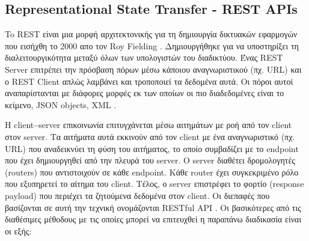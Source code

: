\subsection{Representational State Transfer - REST APIs}

To REST είναι μια μορφή αρχιτεκτονικής για τη δημιουργία δικτυακών εφαρμογών που εισήχθη το 2000 απο τον Roy Fielding \cite{[REST2]}. Δημιουργήθηκε για να υποστηρίξει τη διαλειτουργικότητα μεταξύ όλων των υπολογιστών του διαδικτύου. Ένας REST Server επιτρέπει την πρόσβαση πόρων μέσω κάποιου αναγνωριστικού (πχ. URL) και ο REST Client απλώς λαμβάνει και τροποποιεί τα δεδομένα αυτά. Οι πόροι αυτοί αναπαρίστανται με διάφορες μορφές εκ των οποίων οι πιο διαδεδομένες είναι το κείμενο, JSON objects, XML \cite{[REST1]}. 

Η client\textbf{--}server επικοινωνία επιτυγχάνεται μέσω αιτημάτων με ροή από τον client στον server. Tα αιτήματα αυτά εκκινούν από τον client με ένα αναγνωριστικό (πχ. URL) που αναδεικνύει τη φύση του αιτήματος, το οποίο συμβαδίζει με το endpoint που έχει δημιουργηθεί από την πλευρά του server. Ο server διαθέτει δρομολογητές (routers) που αντιστοιχούν σε κάθε endpoint. Κάθε router έχει συγκεκριμένο ρόλο που εξυπηρετεί το αίτημα του client. Τέλος, ο server επιστρέφει το φορτίο (response payload) που περιέχει τα ζητούμενα δεδομένα στον client. Οι διεπαφές που βασίζονται σε αυτή την τεχνική ονομάζονται RESTful API \cite{[REST3]}. Οι βασικότερες από τις διαθέσιμες μέθοδους με τις οποίες μπορεί να επιτευχθεί η παραπάνω διαδικασία είναι οι εξής:

